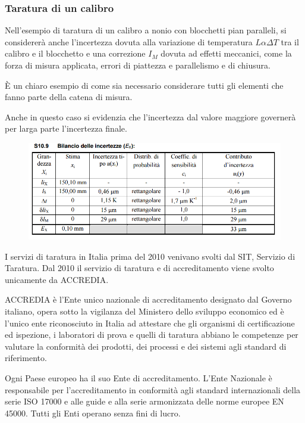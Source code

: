 \documentclass[a4paper, 15pt]{article}
\begin{document}
\subsubsection{Taratura di un calibro}
\begin{adjustwidth}{2in}{}    		
   		Nell'esempio di taratura di un calibro a nonio con blocchetti pian paralleli, si considererà anche l'incertezza dovuta alla variazione di temperatura \(L\alpha\Delta T\) tra il calibro e il blocchetto e una correzione $I_M$ dovuta ad effetti meccanici, come la forza di misura applicata, errori di piattezza e parallelismo e di chiusura.\newline 
   		
   		È un chiaro esempio di come sia necessario considerare tutti gli elementi che fanno parte della catena di misura. \newline 
   		
   		Anche in questo caso si evidenzia che l'incertezza dal valore maggiore governerà per larga parte l'incertezza finale.  		
\begin{figure}[H]
	\centering
	\includegraphics[width=0.5\linewidth]{fig/screenshot014}
	\label{fig:screenshot014}
\end{figure}
   		I servizi di taratura in Italia prima del 2010 venivano svolti dal SIT, Servizio di Taratura. Dal 2010 il servizio di taratura e di accreditamento viene svolto unicamente
   		da ACCREDIA. 
   		
   		ACCREDIA è l'Ente unico nazionale di accreditamento designato dal
   		Governo italiano, opera sotto la vigilanza del Ministero dello sviluppo economico ed è l'unico ente riconosciuto in Italia ad attestare che gli
   		organismi di certificazione ed ispezione, i laboratori di prova e quelli di taratura abbiano le competenze per valutare
   		la conformità dei prodotti, dei processi e dei sistemi agli standard di
   		riferimento.
   		
   		Ogni Paese europeo ha il suo Ente di accreditamento. L'Ente Nazionale è
   		responsabile per l'accreditamento in conformità agli standard internazionali
   		della serie ISO 17000 e alle guide e alla serie armonizzata delle norme
   		europee EN 45000. Tutti gli Enti operano senza fini di lucro.\newline 
   		

\end{adjustwidth}
\end{document}
